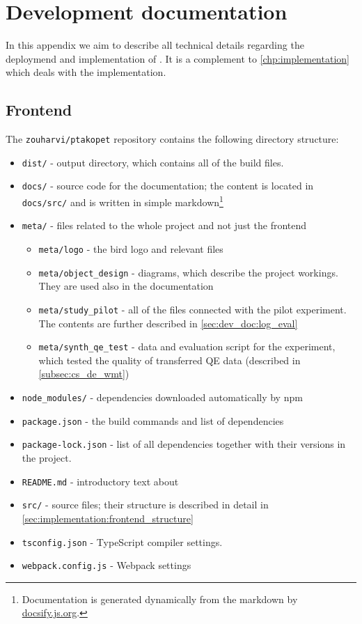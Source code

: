 \chapter{Development documentation}
\label{chp:development_doc}

In this appendix we aim to describe all technical details regarding the deploymend and implementation of \ptakopet{}. It is a complement to \cref{chp:implementation} which deals with the implementation.

\section{Frontend}

The \texttt{zouharvi/ptakopet} repository contains the following directory structure:

\begin{itemize}
    \item \texttt{dist/} - output directory, which contains all of the build files.
    \item \texttt{docs/} - source code for the \ptakopet{} documentation; the content is located in \texttt{docs/src/} and is written in simple markdown\footnote{Documentation is generated dynamically from the markdown by \href{https://docsify.js.org/}{docsify.js.org}.}
    \item \texttt{meta/}
        - files related to the whole project and not just the frontend
        \begin{itemize}
            \item \texttt{meta/logo} - the \ptakopet{} bird logo and relevant files
            \item \texttt{meta/object\_design} - diagrams, which describe the project workings. They are used also in the documentation
            \item \texttt{meta/study\_pilot} - all of the files connected with the pilot experiment. The contents are further described in \cref{sec:dev_doc:log_eval}
        \item \texttt{meta/synth\_qe\_test} - data and evaluation script for the experiment, which tested the quality of transferred QE data (described in \cref{subsec:cs_de_wmt})
        \end{itemize}
    \item \texttt{node\_modules/} - dependencies downloaded automatically by npm
    \item \texttt{package.json} - the build commands and list of dependencies
    \item \texttt{package-lock.json} - list of all dependencies together with their versions in the project.
    \item \texttt{README.md} - introductory text about \ptakopet{}
    \item \texttt{src/} - source files; their structure is described in detail in \cref{sec:implementation:frontend_structure}
    \item \texttt{tsconfig.json} - TypeScript compiler settings.
    \item \texttt{webpack.config.js} - Webpack settings
\end{itemize}

